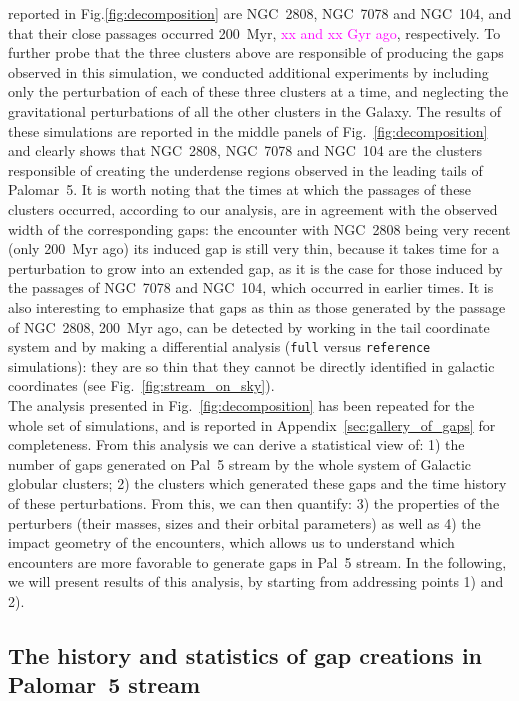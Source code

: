 \documentclass[draft]{aa}
\newcommand{\paola}[1]{\textcolor{magenta}{{#1}}}
\begin{document}
reported in Fig.\ref{fig:decomposition} are NGC~2808, NGC~7078 and NGC~104, and that their close passages occurred 200~Myr, \paola{xx and xx Gyr ago}, respectively. To further probe that the three clusters above are responsible of producing the gaps observed in this simulation, we conducted additional experiments by including only the perturbation of each of these three clusters at a time, and neglecting the gravitational perturbations of all the other clusters in the Galaxy. The results of these simulations are reported in the middle panels of Fig.~\ref{fig:decomposition} and clearly shows that NGC~2808, NGC~7078 and NGC~104 are the clusters responsible of creating the underdense regions observed in the leading tails of Palomar~5. It is worth noting that the times at which the passages of these clusters occurred, according to our analysis, are in agreement with the observed width of the corresponding gaps: the encounter with NGC~2808 being very recent (only 200~Myr ago) its induced gap is still very thin, because it takes time for a perturbation to grow into an extended gap, as it is the case for those induced by the passages of  NGC~7078 and NGC~104, which occurred in earlier times. It is also interesting to emphasize that gaps as thin as those generated by the passage of NGC~2808, 200~Myr ago, can be detected by working in the tail coordinate system and by making a differential analysis (\texttt{full} versus \texttt{reference} simulations): they are so thin that they cannot be directly identified in galactic coordinates (see Fig.~\ref{fig:stream_on_sky}).\\

    The analysis presented in Fig.~\ref{fig:decomposition} has been repeated for the whole set of simulations, and is reported in Appendix~\ref{sec:gallery_of_gaps} for completeness. From this analysis we can derive a statistical view of: 1) the number of gaps generated on Pal~5 stream by the whole system of Galactic globular clusters; 2) the clusters which generated these gaps and the time history of these perturbations. From this, we can then quantify: 3) the properties of the perturbers (their masses, sizes and their orbital parameters) as well as 4) the impact geometry of the encounters, which allows us to understand which encounters are more favorable to generate gaps in Pal~5 stream. In the following, we will present results of this analysis, by starting from addressing points 1) and 2).





  \subsection{The history and statistics of gap creations in Palomar~5 stream}\label{sect:history}
  
\end{document}
